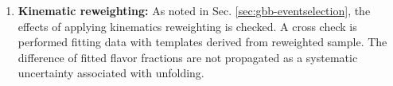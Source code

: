 \begin{enumerate}
  \item \textbf{Kinematic reweighting:} As noted in Sec. \ref{sec:gbb-eventselection}, the effects of applying kinematics reweighting is checked. A cross check is performed fitting data with templates derived from reweighted sample. The difference of fitted flavor fractions are not propagated as a systematic uncertainty associated with unfolding.

\end{enumerate}



